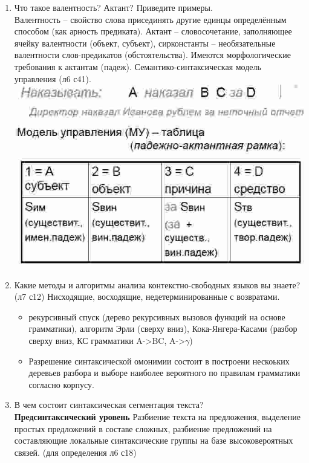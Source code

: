 \documentclass[a4paper]{article}
\begin{document}
\begin{enumerate}
	\item Что такое валентность? Актант? Приведите примеры.\hfill\\
	Валентность -- свойство слова присединять другие единцы определённым способом (как арность предиката). Актант -- словосочетание, заполняющее ячейку валентности (объект, субъект), сирконстанты -- необязательные валентности слов-предикатов (обстоятельства). Имеются морфологические требования к актантам (падеж). Семантико-синтаксическая модель управления (л6 с41).\hfill\\
	\includegraphics[scale=0.5]{valency}

	\item Какие методы и алгоритмы анализа контекстно-свободных языков вы знаете?\hfill\\
	(л7 с12) Нисходящие, восходящие, недетерминированные с возвратами. \begin{itemize}
		\item рекурсивный спуск (дерево рекурсивных вызовов функций на основе грамматики), алгоритм Эрли (сверху вниз), Кока-Янгера-Касами (разбор сверху вниз, КС грамматики A->BC, A->$\gamma$)
		\item Разрешение синтаксической омонимии состоит в построени нескоьких деревьев разбора и выборе наиболее вероятного по правилам грамматики согласно корпусу.
	\end{itemize}

	\item В чем состоит синтаксическая сегментация текста?\hfill\\
	\textbf{Предсинтаксический уровень} Разбиение текста на предложения, выделение простых предложений в составе сложных, разбиение предложений на составляющие локальные синтаксические группы на базе высоковероятных связей. (для определения л6 с18)


\end{enumerate}
\end{document}

